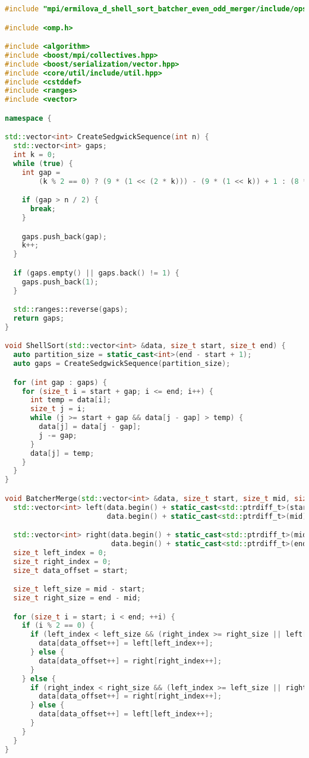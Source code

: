 \documentclass[a4paper,12pt]{article}
\begin{document}
\begin{lstlisting}[language=C++]
#include "mpi/ermilova_d_shell_sort_batcher_even_odd_merger/include/ops_all.hpp"

#include <omp.h>

#include <algorithm>
#include <boost/mpi/collectives.hpp>
#include <boost/serialization/vector.hpp>
#include <core/util/include/util.hpp>
#include <cstddef>
#include <ranges>
#include <vector>

namespace {

std::vector<int> CreateSedgwickSequence(int n) {
  std::vector<int> gaps;
  int k = 0;
  while (true) {
    int gap =
        (k % 2 == 0) ? (9 * (1 << (2 * k))) - (9 * (1 << k)) + 1 : (8 * (1 << k)) - (6 * (1 << ((k + 1) / 2))) + 1;

    if (gap > n / 2) {
      break;
    }

    gaps.push_back(gap);
    k++;
  }

  if (gaps.empty() || gaps.back() != 1) {
    gaps.push_back(1);
  }

  std::ranges::reverse(gaps);
  return gaps;
}

void ShellSort(std::vector<int> &data, size_t start, size_t end) {
  auto partition_size = static_cast<int>(end - start + 1);
  auto gaps = CreateSedgwickSequence(partition_size);

  for (int gap : gaps) {
    for (size_t i = start + gap; i <= end; i++) {
      int temp = data[i];
      size_t j = i;
      while (j >= start + gap && data[j - gap] > temp) {
        data[j] = data[j - gap];
        j -= gap;
      }
      data[j] = temp;
    }
  }
}

void BatcherMerge(std::vector<int> &data, size_t start, size_t mid, size_t end) {
  std::vector<int> left(data.begin() + static_cast<std::ptrdiff_t>(start),
                        data.begin() + static_cast<std::ptrdiff_t>(mid));

  std::vector<int> right(data.begin() + static_cast<std::ptrdiff_t>(mid),
                         data.begin() + static_cast<std::ptrdiff_t>(end));
  size_t left_index = 0;
  size_t right_index = 0;
  size_t data_offset = start;

  size_t left_size = mid - start;
  size_t right_size = end - mid;

  for (size_t i = start; i < end; ++i) {
    if (i % 2 == 0) {
      if (left_index < left_size && (right_index >= right_size || left[left_index] <= right[right_index])) {
        data[data_offset++] = left[left_index++];
      } else {
        data[data_offset++] = right[right_index++];
      }
    } else {
      if (right_index < right_size && (left_index >= left_size || right[right_index] <= left[left_index])) {
        data[data_offset++] = right[right_index++];
      } else {
        data[data_offset++] = left[left_index++];
      }
    }
  }
}


\end{lstlisting}
\end{document}
